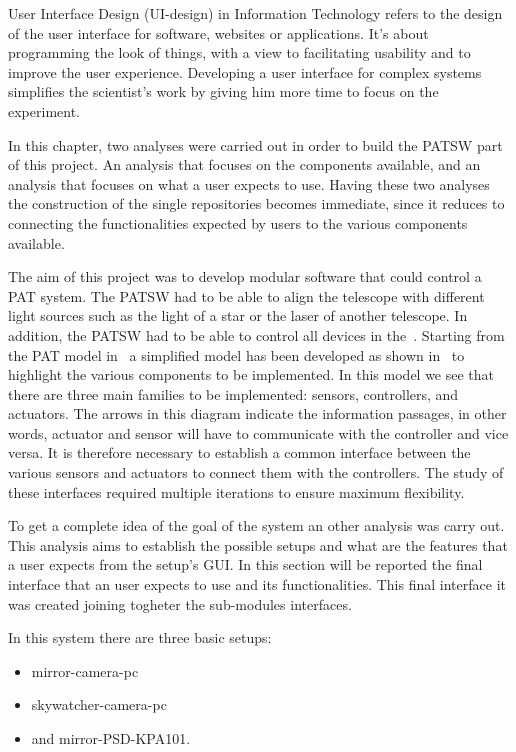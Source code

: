 User Interface Design (UI-design) in Information Technology refers to the design of the user interface for software, websites or applications. It’s about programming the look of things, with a view to facilitating usability and to improve the user experience. Developing a user interface for complex systems simplifies the scientist’s work by giving him more time to focus on the experiment.

In this chapter, two analyses were carried out in order to build the PATSW part of this project. An analysis that focuses on the components available, and an analysis that focuses on what a user expects to use. Having these two analyses the construction of the single repositories becomes immediate, since it reduces to connecting the functionalities expected by users to the various components available.


The aim of this project was to develop modular software that could control a PAT system. The PATSW had to be able to align the telescope with different light sources such as the light of a star or the laser of another telescope.
In addition, the PATSW had to be able to control all devices in the~.
Starting from the PAT model in~ a simplified model has been developed as shown in~ to highlight the various components to be implemented.
In this model we see that there are three main families to be implemented: sensors, controllers, and actuators. The arrows in this diagram indicate the information passages, in other words, actuator and sensor will have to communicate with the controller and vice versa.
It is therefore necessary to establish a common interface between the various sensors and actuators to connect them with the controllers. The study of these interfaces required multiple iterations to ensure maximum flexibility.

To get a complete idea of the goal of the system an other analysis was carry out. This analysis aims to establish the possible setups and what are the features that a user expects from the setup's GUI.
In this section will be reported the final interface that an user expects to use and its functionalities. This final interface it was created joining togheter the sub-modules interfaces.

In this system there are three basic setups:
\begin{itemize}
      \item mirror-camera-pc
      \item skywatcher-camera-pc
      \item and mirror-PSD-KPA101.
\end{itemize}

